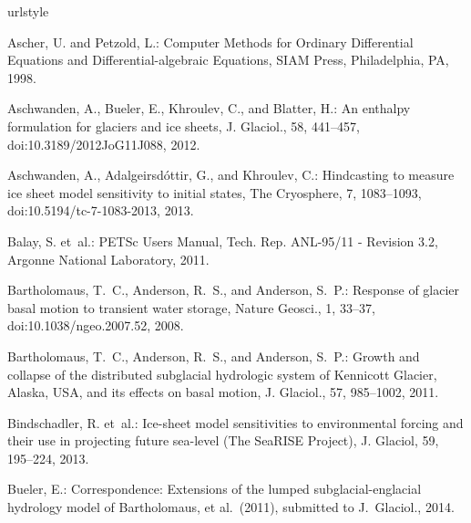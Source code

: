 \documentclass[gmd]{copernicus}   %
\begin{document}
\begin{thebibliography}{}
\providecommand{\natexlab}[1]{#1}
\providecommand{\url}[1]{{\tt #1}}
\providecommand{\urlprefix}{URL }
\expandafter\ifx\csname urlstyle\endcsname\relax
  \providecommand{\doi}[1]{doi:\discretionary{}{}{}#1}\else
  \providecommand{\doi}{doi:\discretionary{}{}{}\begingroup
  \urlstyle{rm}\Url}\fi

Ascher, U. and Petzold, L.: Computer {M}ethods for {O}rdinary {D}ifferential
  {E}quations and {D}ifferential-algebraic {E}quations, SIAM Press,
  Philadelphia, PA, 1998.

Aschwanden, A., Bueler, E., Khroulev, C., and Blatter, H.: An enthalpy
  formulation for glaciers and ice sheets, J. Glaciol., 58, 441--457,
  \doi{10.3189/2012JoG11J088}, 2012.

Aschwanden, A., Adalgeirsd{\'o}ttir, G., and Khroulev, C.: Hindcasting to
  measure ice sheet model sensitivity to initial states, The Cryosphere, 7,
  1083--1093, \doi{10.5194/tc-7-1083-2013}, 2013.

Balay, S. et~al.: {PETS}c {U}sers {M}anual, Tech. Rep. ANL-95/11 - Revision
  3.2, Argonne National Laboratory, 2011.

Bartholomaus, T.~C., Anderson, R.~S., and Anderson, S.~P.: Response of glacier
  basal motion to transient water storage, Nature Geosci., 1, 33--37,
  \doi{10.1038/ngeo.2007.52}, 2008.

Bartholomaus, T.~C., Anderson, R.~S., and Anderson, S.~P.: Growth and collapse
  of the distributed subglacial hydrologic system of {K}ennicott {G}lacier,
  {A}laska, {USA}, and its effects on basal motion, J. Glaciol., 57, 985--1002,
  2011.

Bindschadler, R. et~al.: Ice-sheet model sensitivities to environmental forcing
  and their use in projecting future sea-level ({T}he {S}ea{RISE} {P}roject),
  J. Glaciol, 59, 195--224, 2013.

Bueler, E.: Correspondence: Extensions of the lumped subglacial-englacial
  hydrology model of {B}artholomaus, et al.~(2011), submitted to J.~Glaciol.,
  2014.


\end{thebibliography}
\end{document}
